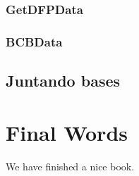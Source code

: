 \documentclass[
]{book}
\begin{document}
\hypertarget{getdfpdata}{%
\subsection{GetDFPData}\label{getdfpdata}}

\hypertarget{bcbdata}{%
\subsection{BCBData}\label{bcbdata}}

\hypertarget{juntando-bases}{%
\section{Juntando bases}\label{juntando-bases}}

\hypertarget{final-words}{%
\chapter{Final Words}\label{final-words}}

We have finished a nice book.

  
\end{document}
